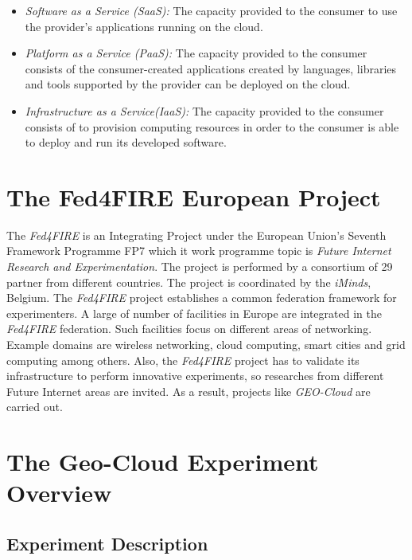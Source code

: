 \begin{itemize}
\item \emph{Software as a Service (SaaS):} The capacity provided to the consumer
  to use   the provider's applications running on the cloud.
\item \emph{Platform as a Service (PaaS):} The capacity provided to the consumer
  consists of the consumer-created applications created by languages, libraries
  and tools supported by the provider can be deployed on the cloud.
\item \emph{Infrastructure as a Service(IaaS):} The capacity provided to the
  consumer consists of to provision computing resources in order to the consumer
  is able to deploy and run its developed software.
\end{itemize} 



\section{The Fed4FIRE European Project}%
The \emph{Fed4FIRE} is an Integrating Project under the European Union's Seventh
Framework Programme \ac{FP7} which it work programme topic is \emph{Future
  Internet Research and Experimentation}. The project is performed by a
consortium of 29 partner from different countries. The project is coordinated by
the \emph{iMinds}, Belgium. 
The \emph{Fed4FIRE} project establishes a common federation framework for
experimenters. A large of number of facilities in Europe are integrated in the
\emph{Fed4FIRE} federation. Such facilities focus on different  areas
of networking. Example domains are wireless networking, cloud computing, smart
cities and grid computing among others.
Also, the \emph{Fed4FIRE} project has to validate its infrastructure to perform
innovative experiments, so researches from different Future Internet areas
are invited. As a result, projects like \emph{GEO-Cloud} are carried out.

\section{The Geo-Cloud Experiment Overview}


\subsection{Experiment Description}


